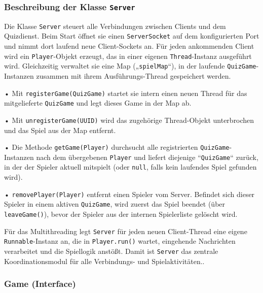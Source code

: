 \documentclass[12pt]{article}
\begin{document}
\subsubsection*{Beschreibung der Klasse \texttt{Server}}

Die Klasse \texttt{Server} steuert alle Verbindungen zwischen Clients und dem Quizdienst.
Beim Start öffnet sie einen \texttt{ServerSocket} auf dem konfigurierten Port und nimmt dort laufend neue Client-Sockets an.
Für jeden ankommenden Client wird ein \texttt{Player}-Objekt erzeugt, das in einer eigenen \texttt{Thread}-Instanz ausgeführt wird.
Gleichzeitig verwaltet sie eine Map („\texttt{spielMap}“), in der laufende \texttt{QuizGame}-Instanzen zusammen mit ihrem Ausführungs-Thread gespeichert werden.

• Mit \texttt{registerGame(QuizGame)} startet sie intern einen neuen Thread für das mitgelieferte \texttt{QuizGame} und legt dieses Game in der Map ab.

• Mit \texttt{unregisterGame(UUID)} wird das zugehörige Thread-Objekt unterbrochen und das Spiel aus der Map entfernt.

• Die Methode \texttt{getGame(Player)} durchsucht alle registrierten \texttt{QuizGame}-Instanzen nach dem übergebenen \texttt{Player} und liefert diejenige “\texttt{QuizGame}“ zurück, in der der Spieler aktuell mitspielt (oder \texttt{null}, falls kein laufendes Spiel gefunden wird).

• \texttt{removePlayer(Player)} entfernt einen Spieler vom Server. Befindet sich dieser Spieler in einem aktiven \texttt{QuizGame}, wird zuerst das Spiel beendet (über \texttt{leaveGame()}), bevor der Spieler aus der internen Spielerliste gelöscht wird.

Für das Multithreading legt \texttt{Server} für jeden neuen Client-Thread eine eigene \texttt{Runnable}-Instanz an, die in \texttt{Player.run()} wartet, eingehende Nachrichten verarbeitet und die Spiellogik anstößt. Damit ist \texttt{Server} das zentrale Koordinationsmodul für alle Verbindungs- und Spielaktivitäten..

\subsubsection*{Game (Interface)}
\end{document}
